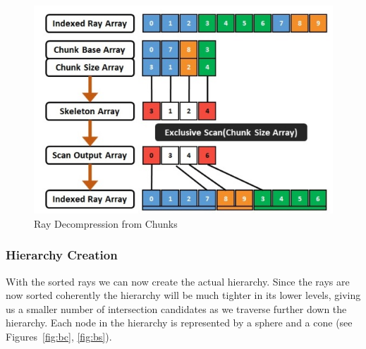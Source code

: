 \documentclass{egpubl}
\begin{document}
\begin{figure}[!htb]
    \centering
    \includegraphics[scale=0.50]{images/ray-decompression.jpg}
    \caption{Ray Decompression from Chunks}
\end{figure}

\subsubsection{Hierarchy Creation}

With the sorted rays we can now create the actual hierarchy. Since the rays are now sorted coherently the hierarchy will be much tighter in its lower levels, giving us a smaller number of intersection candidates as we traverse further down the hierarchy.
Each node in the hierarchy is represented by a sphere and a cone (see Figures~\ref{fig:bc}, \ref{fig:bs}).
\end{document}
